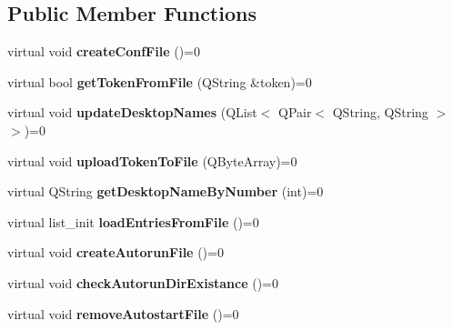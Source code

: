 \subsection*{Public Member Functions}
\begin{DoxyCompactItemize}
\item 
\mbox{\label{classIA__CFileManager_a347f80b95922d346b6b4891870bfb118}} 
virtual void {\bfseries create\+Conf\+File} ()=0
\item 
\mbox{\label{classIA__CFileManager_a242f8f70533041caaaa7e24e9f0b607d}} 
virtual bool {\bfseries get\+Token\+From\+File} (Q\+String \&token)=0
\item 
\mbox{\label{classIA__CFileManager_aef9f9f9c2aeef0566b4a35c9b3def784}} 
virtual void {\bfseries update\+Desktop\+Names} (Q\+List$<$ Q\+Pair$<$ Q\+String, Q\+String $>$$>$)=0
\item 
\mbox{\label{classIA__CFileManager_a4a8b7d4ab0abb737e4a5f2a416717247}} 
virtual void {\bfseries upload\+Token\+To\+File} (Q\+Byte\+Array)=0
\item 
\mbox{\label{classIA__CFileManager_a1d17b738e6e023f235c3e55afe13b0bb}} 
virtual Q\+String {\bfseries get\+Desktop\+Name\+By\+Number} (int)=0
\item 
\mbox{\label{classIA__CFileManager_a476b01b528533cbb6ef0a8c7ef573de0}} 
virtual list\+\_\+init {\bfseries load\+Entries\+From\+File} ()=0
\item 
\mbox{\label{classIA__CFileManager_af5f86459a7273e0746f601c2ff8e0d2c}} 
virtual void {\bfseries create\+Autorun\+File} ()=0
\item 
\mbox{\label{classIA__CFileManager_aaa4414688ed5b16e019d0aaadcf9192f}} 
virtual void {\bfseries check\+Autorun\+Dir\+Existance} ()=0
\item 
\mbox{\label{classIA__CFileManager_ab10e29d733e0efc3dcb634b5996df9a1}} 
virtual void {\bfseries remove\+Autostart\+File} ()=0
\item 
\mbox{\label{classIA__CFileManager_a71dbf8bdd1bb308b6f47efe65303f159}} 
$$
\end{DoxyCompactItemize}
